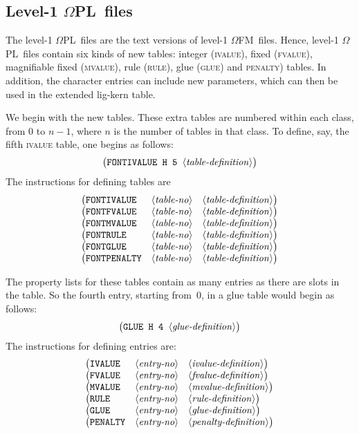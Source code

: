 \documentclass[fleqn]{article}
\newcommand{\OMEGA}{$\Omega$}
\newcommand{\OFM}{\OMEGA FM}
\newcommand{\OPL}{\OMEGA PL}
\newcommand{\showtno}{\langle\mbox{\emph{table-no}}\rangle}
\newcommand{\showeno}{\langle\mbox{\emph{entry-no}}\rangle}
\newcommand{\showtable}{\langle\mbox{\emph{table-definition}}\rangle}
\newcommand{\showrule}{\langle\mbox{\emph{rule-definition}}\rangle}
\newcommand{\showglue}{\langle\mbox{\emph{glue-definition}}\rangle}
\newcommand{\showivalue}{\langle\mbox{\emph{ivalue-definition}}\rangle}
\newcommand{\showfvalue}{\langle\mbox{\emph{fvalue-definition}}\rangle}
\newcommand{\showmvalue}{\langle\mbox{\emph{mvalue-definition}}\rangle}
\newcommand{\showpenaltydef}{\langle\mbox{\emph{penalty-definition}}\rangle}
\begin{document}
\subsection{Level-1 \OPL\ files}

The level-1 \OPL\ files are the text versions of level-1 \OFM\ files.
Hence, level-1 \OPL\ files contain six kinds of new tables:
integer (\textsc{ivalue}), fixed (\textsc{fvalue}),
magnifiable fixed (\textsc{mvalue}), rule (\textsc{rule}),
glue (\textsc{glue}) and \textsc{penalty}) tables.
In addition, the character entries can include new parameters,
which can then be used in the extended lig-kern table.

We begin with the new tables.
These extra tables are numbered within each class, from 0 to $n-1$,
where $n$ is the number of tables in that class.  To define, say,
the fifth \textsc{ivalue} table, one begins as follows:
\[
     \bigl(\texttt{FONTIVALUE H 5 } \showtable\bigr)
\]
The instructions for defining tables are
\[
\begin{array}{lll}
     \bigl(\texttt{FONTIVALUE} & \showtno & \showtable\bigr)\\
     \bigl(\texttt{FONTFVALUE} & \showtno & \showtable\bigr)\\
     \bigl(\texttt{FONTMVALUE} & \showtno & \showtable\bigr)\\
     \bigl(\texttt{FONTRULE}   & \showtno & \showtable\bigr)\\
     \bigl(\texttt{FONTGLUE}   & \showtno & \showtable\bigr)\\
     \bigl(\texttt{FONTPENALTY}& \showtno & \showtable\bigr)\\
\end{array}
\]

The property lists for these tables contain as many entries as there are
slots in the table.  So the fourth entry, starting from~0, in a glue
table would begin as follows:
\[
     \bigl(\texttt{GLUE H 4 } \showglue\bigr)
\]
The instructions for defining entries are:
\[
\begin{array}{lll}
     \bigl(\texttt{IVALUE} & \showeno & \showivalue\bigr)\\
     \bigl(\texttt{FVALUE} & \showeno & \showfvalue\bigr)\\
     \bigl(\texttt{MVALUE} & \showeno & \showmvalue\bigr)\\
     \bigl(\texttt{RULE}   & \showeno & \showrule\bigr)\\
     \bigl(\texttt{GLUE}   & \showeno & \showglue\bigr)\\
     \bigl(\texttt{PENALTY}& \showeno & \showpenaltydef\bigr)\\
\end{array}
\]
\end{document}

